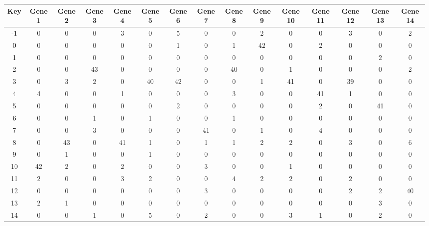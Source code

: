 \begin{tabular}{|c|c|c|c|c|c|c|c|c|c|c|c|c|c|c|}
\hline
Key & Gene 1 & Gene 2 & Gene 3 & Gene 4 & Gene 5 & Gene 6 & Gene 7 & Gene 8 & Gene 9 & Gene 10 & Gene 11 & Gene 12 & Gene 13 & Gene 14 \\
\hline
-1 & 0 & 0 & 0 & 3 & 0 & 5 & 0 & 0 & 2 & 0 & 0 & 3 & 0 & 2 \\
0 & 0 & 0 & 0 & 0 & 0 & 1 & 0 & 1 & 42 & 0 & 2 & 0 & 0 & 0 \\
1 & 0 & 0 & 0 & 0 & 0 & 0 & 0 & 0 & 0 & 0 & 0 & 0 & 2 & 0 \\
2 & 0 & 0 & 43 & 0 & 0 & 0 & 0 & 40 & 0 & 1 & 0 & 0 & 0 & 2 \\
3 & 0 & 3 & 2 & 0 & 40 & 42 & 0 & 0 & 1 & 41 & 0 & 39 & 0 & 0 \\
4 & 4 & 0 & 0 & 1 & 0 & 0 & 0 & 3 & 0 & 0 & 41 & 1 & 0 & 0 \\
5 & 0 & 0 & 0 & 0 & 0 & 2 & 0 & 0 & 0 & 0 & 2 & 0 & 41 & 0 \\
6 & 0 & 0 & 1 & 0 & 1 & 0 & 0 & 1 & 0 & 0 & 0 & 0 & 0 & 0 \\
7 & 0 & 0 & 3 & 0 & 0 & 0 & 41 & 0 & 1 & 0 & 4 & 0 & 0 & 0 \\
8 & 0 & 43 & 0 & 41 & 1 & 0 & 1 & 1 & 2 & 2 & 0 & 3 & 0 & 6 \\
9 & 0 & 1 & 0 & 0 & 1 & 0 & 0 & 0 & 0 & 0 & 0 & 0 & 0 & 0 \\
10 & 42 & 2 & 0 & 2 & 0 & 0 & 3 & 0 & 0 & 1 & 0 & 0 & 0 & 0 \\
11 & 2 & 0 & 0 & 3 & 2 & 0 & 0 & 4 & 2 & 2 & 0 & 2 & 0 & 0 \\
12 & 0 & 0 & 0 & 0 & 0 & 0 & 3 & 0 & 0 & 0 & 0 & 2 & 2 & 40 \\
13 & 2 & 1 & 0 & 0 & 0 & 0 & 0 & 0 & 0 & 0 & 0 & 0 & 3 & 0 \\
14 & 0 & 0 & 1 & 0 & 5 & 0 & 2 & 0 & 0 & 3 & 1 & 0 & 2 & 0 \\
\hline
\end{tabular}